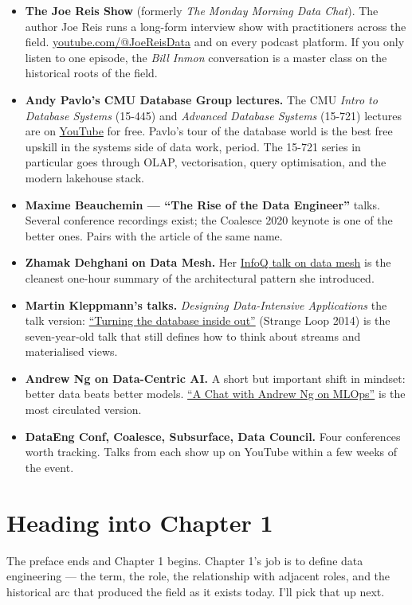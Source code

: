 \begin{itemize}[leftmargin=*]
  \item \textbf{The Joe Reis Show} (formerly \emph{The Monday Morning Data Chat}). The author Joe Reis runs a long-form interview show with practitioners across the field. \href{https://www.youtube.com/@JoeReisData}{youtube.com/@JoeReisData} and on every podcast platform. If you only listen to one episode, the \emph{Bill Inmon} conversation is a master class on the historical roots of the field.
  \item \textbf{Andy Pavlo's CMU Database Group lectures.} The CMU \emph{Intro to Database Systems} (15-445) and \emph{Advanced Database Systems} (15-721) lectures are on \href{https://www.youtube.com/@CMUDatabaseGroup}{YouTube} for free. Pavlo's tour of the database world is the best free upskill in the systems side of data work, period. The 15-721 series in particular goes through OLAP, vectorisation, query optimisation, and the modern lakehouse stack.
  \item \textbf{Maxime Beauchemin --- ``The Rise of the Data Engineer''} talks. Several conference recordings exist; the Coalesce 2020 keynote is one of the better ones. Pairs with the article of the same name.
  \item \textbf{Zhamak Dehghani on Data Mesh.} Her \href{https://www.youtube.com/watch?v=TVxdW2gG3X8}{InfoQ talk on data mesh} is the cleanest one-hour summary of the architectural pattern she introduced.
  \item \textbf{Martin Kleppmann's talks.} \emph{Designing Data-Intensive Applications} the talk version: \href{https://www.youtube.com/watch?v=v2RJ1XMkPvs}{``Turning the database inside out''} (Strange Loop 2014) is the seven-year-old talk that still defines how to think about streams and materialised views.
  \item \textbf{Andrew Ng on Data-Centric AI.} A short but important shift in mindset: better data beats better models. \href{https://www.youtube.com/watch?v=06-AZXmwHjo}{``A Chat with Andrew Ng on MLOps''} is the most circulated version.
  \item \textbf{DataEng Conf, Coalesce, Subsurface, Data Council.} Four conferences worth tracking. Talks from each show up on YouTube within a few weeks of the event.
\end{itemize}

\section*{Heading into Chapter 1}

The preface ends and Chapter 1 begins. Chapter 1's job is to define data engineering — the term, the role, the relationship with adjacent roles, and the historical arc that produced the field as it exists today. I'll pick that up next.

\clearpage
